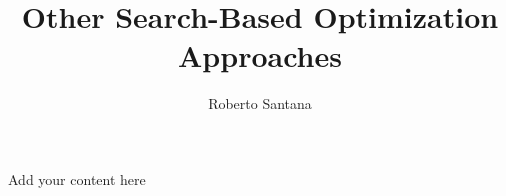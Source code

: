 \title{Other Search-Based Optimization Approaches}
\label{chp:other-search-based-optimization-approaches}
\author{Roberto Santana}
\maketitle

Add your content here
 




